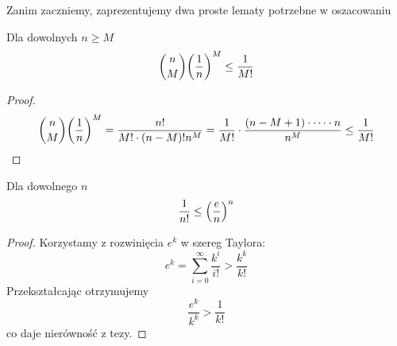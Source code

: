Zanim zaczniemy, zaprezentujemy dwa proste lematy potrzebne w oszacowaniu
\begin{lemma}
	Dla dowolnych \( n \geq M \)
	\[
		\binom{n}{M} \pars{\frac{1}{n}}^M \leq \frac{1}{M!}
	\]
\end{lemma}
\begin{proof}
	\[
		\binom{n}{M} \pars{\frac{1}{n}}^M = \frac{n!}{M!\cdot(n-M)!n^M} =
		\frac{1}{M!}\cdot\frac{(n-M+1)\cdot \dots \cdot n}{n^M} \leq \frac{1}{M!}
	\]
\end{proof}

\begin{lemma}
	Dla dowolnego \( n \)
	\[
		\frac{1}{n!} \leq \left(\frac{e}{n}\right)^n
	\]
\end{lemma}
\begin{proof}
	Korzystamy z rozwinięcia \( e^k \) w szereg Taylora:
	\[
		e^k = \sum_{i=0}^\infty \frac{k^i}{i!} > \frac{k^k}{k!}
	\]
	Przekształcając otrzymujemy
	\[
		\frac{e^k}{k^k} > \frac{1}{k!}
	\]
	co daje nierówność z tezy.
\end{proof}

